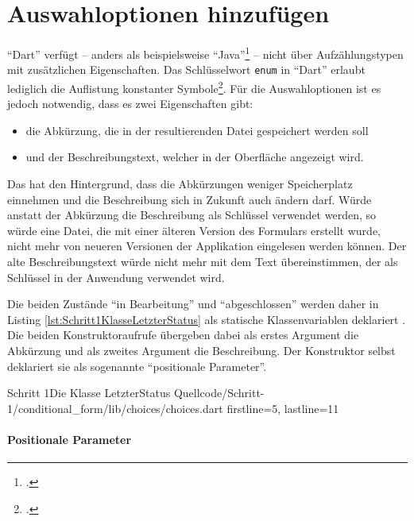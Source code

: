 \section{Auswahloptionen hinzufügen}

\enquote{Dart} verfügt -- anders als beispielsweise \enquote{Java}\footcite[Vgl.][S. 321]{TheJavaLanguageSpecificationJavaSE16Edition} -- nicht über Aufzählungstypen mit zusätzlichen Eigenschaften.
Das Schlüsselwort \texttt{enum} in \enquote{Dart} erlaubt lediglich die Auflistung konstanter Symbole\footcite[Vgl.][S. 74f.]{DartProgrammingLanguageSpecification5thedition}.
Für die Auswahloptionen ist es jedoch notwendig, dass es zwei Eigenschaften gibt:
\begin{itemize}
  \parsep 0pt
  \topsep 0pt
  \itemsep 0pt

  \item die Abkürzung, die in der resultierenden Datei gespeichert werden soll
  \item und der Beschreibungstext, welcher in der Oberfläche angezeigt wird.
\end{itemize}
Das hat den Hintergrund, dass die Abkürzungen weniger Speicherplatz einnehmen und die Beschreibung sich in Zukunft auch ändern darf.
Würde anstatt der Abkürzung die Beschreibung als Schlüssel verwendet werden, so würde eine Datei, die mit einer älteren Version des Formulars erstellt wurde, nicht mehr von neueren Versionen der Applikation eingelesen werden können.
Der alte Beschreibungstext würde nicht mehr mit dem Text übereinstimmen, der als Schlüssel in der Anwendung verwendet wird.


Die beiden Zustände \enquote{in Bearbeitung} und \enquote{abgeschlossen} werden daher in Listing \ref{lst:Schritt1KlasseLetzterStatus} als statische Klassenvariablen deklariert .
Die beiden Konstruktoraufrufe übergeben dabei als erstes Argument die Abkürzung und als zweites Argument die Beschreibung.
Der Konstruktor selbst  deklariert sie als sogenannte \enquote{positionale Parameter}.



\begin{alexlisting}{Schritt 1}{Die Klasse LetzterStatus}
  {Quellcode/Schritt-1/conditional_form/lib/choices/choices.dart}
  {firstline=5, lastline=11}
  \label{lst:Schritt1KlasseLetzterStatus}
\end{alexlisting}



\paragraph{Positionale Parameter}

